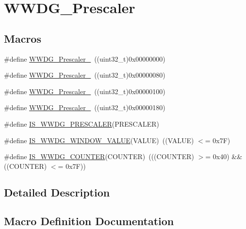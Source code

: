 \hypertarget{group___w_w_d_g___prescaler}{}\section{W\+W\+D\+G\+\_\+\+Prescaler}
\label{group___w_w_d_g___prescaler}
\subsection*{Macros}
\begin{DoxyCompactItemize}
\item 
\#define \mbox{\hyperlink{group___w_w_d_g___prescaler_ga55780dcf60a252724f5aae2ca37d91c5}{W\+W\+D\+G\+\_\+\+Prescaler\+\_}}~((uint32\+\_\+t)0x00000000)
\item 
\#define \mbox{\hyperlink{group___w_w_d_g___prescaler_ga2ac67d0a7f8691b5ebf0d7d77d6b5f08}{W\+W\+D\+G\+\_\+\+Prescaler\+\_}}~((uint32\+\_\+t)0x00000080)
\item 
\#define \mbox{\hyperlink{group___w_w_d_g___prescaler_gab11714e1816967802a8421587e54a2eb}{W\+W\+D\+G\+\_\+\+Prescaler\+\_}}~((uint32\+\_\+t)0x00000100)
\item 
\#define \mbox{\hyperlink{group___w_w_d_g___prescaler_ga7a4933366603869726bd5ea547d99f02}{W\+W\+D\+G\+\_\+\+Prescaler\+\_}}~((uint32\+\_\+t)0x00000180)
\item 
\#define \mbox{\hyperlink{group___w_w_d_g___prescaler_ga39070de0722a70f99a6fcfe8720b2dfd}{I\+S\+\_\+\+W\+W\+D\+G\+\_\+\+P\+R\+E\+S\+C\+A\+L\+ER}}(P\+R\+E\+S\+C\+A\+L\+ER)
\item 
\#define \mbox{\hyperlink{group___w_w_d_g___prescaler_gab6ea714a2380b7d6547ba97363887868}{I\+S\+\_\+\+W\+W\+D\+G\+\_\+\+W\+I\+N\+D\+O\+W\+\_\+\+V\+A\+L\+UE}}(V\+A\+L\+UE)~((V\+A\+L\+UE) $<$= 0x7\+F)
\item 
\#define \mbox{\hyperlink{group___w_w_d_g___prescaler_ga4728877128cd60494692d8f14389112e}{I\+S\+\_\+\+W\+W\+D\+G\+\_\+\+C\+O\+U\+N\+T\+ER}}(C\+O\+U\+N\+T\+ER)~(((C\+O\+U\+N\+T\+ER) $>$= 0x40) \&\& ((\+C\+O\+U\+N\+T\+E\+R) $<$= 0x7\+F))
\end{DoxyCompactItemize}


\subsection{Detailed Description}


\subsection{Macro Definition Documentation}
\mbox{\label{group___w_w_d_g___prescaler_ga4728877128cd60494692d8f14389112e}} 

